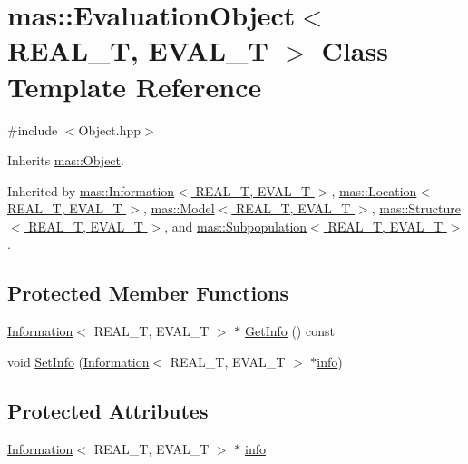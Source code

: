 \hypertarget{classmas_1_1_evaluation_object}{}\section{mas\+:\+:Evaluation\+Object$<$ R\+E\+A\+L\+\_\+\+T, E\+V\+A\+L\+\_\+\+T $>$ Class Template Reference}
\label{classmas_1_1_evaluation_object}


{\ttfamily \#include $<$Object.\+hpp$>$}



Inherits \hyperlink{classmas_1_1_object}{mas\+::\+Object}.



Inherited by \hyperlink{classmas_1_1_information}{mas\+::\+Information$<$ R\+E\+A\+L\+\_\+\+T, E\+V\+A\+L\+\_\+\+T $>$}, \hyperlink{classmas_1_1_location}{mas\+::\+Location$<$ R\+E\+A\+L\+\_\+\+T, E\+V\+A\+L\+\_\+\+T $>$}, \hyperlink{classmas_1_1_model}{mas\+::\+Model$<$ R\+E\+A\+L\+\_\+\+T, E\+V\+A\+L\+\_\+\+T $>$}, \hyperlink{classmas_1_1_structure}{mas\+::\+Structure$<$ R\+E\+A\+L\+\_\+\+T, E\+V\+A\+L\+\_\+\+T $>$}, and \hyperlink{classmas_1_1_subpopulation}{mas\+::\+Subpopulation$<$ R\+E\+A\+L\+\_\+\+T, E\+V\+A\+L\+\_\+\+T $>$}.

\subsection*{Protected Member Functions}
\begin{DoxyCompactItemize}
\item 
\hyperlink{classmas_1_1_information}{Information}$<$ R\+E\+A\+L\+\_\+\+T, E\+V\+A\+L\+\_\+\+T $>$ $\ast$ \hyperlink{classmas_1_1_evaluation_object_af50a7cf1f746956e996acbd7dec5f43b}{Get\+Info} () const 
\item 
void \hyperlink{classmas_1_1_evaluation_object_a4da11c844c820787d892cc83b50d9b88}{Set\+Info} (\hyperlink{classmas_1_1_information}{Information}$<$ R\+E\+A\+L\+\_\+\+T, E\+V\+A\+L\+\_\+\+T $>$ $\ast$\hyperlink{classmas_1_1_evaluation_object_a5029ee28e34a1496c3c46dc82c5d8b8d}{info})
\end{DoxyCompactItemize}
\subsection*{Protected Attributes}
\begin{DoxyCompactItemize}
\item 
\hyperlink{classmas_1_1_information}{Information}$<$ R\+E\+A\+L\+\_\+\+T, E\+V\+A\+L\+\_\+\+T $>$ $\ast$ \hyperlink{classmas_1_1_evaluation_object_a5029ee28e34a1496c3c46dc82c5d8b8d}{info}
\end{DoxyCompactItemize}
